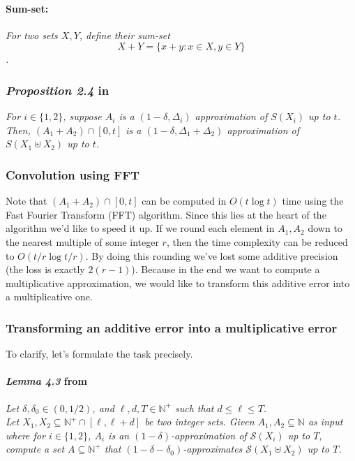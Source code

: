 \paragraph{Sum-set:}
\textit{For two sets \( X, Y \), define their sum-set \[ X + Y = \{x + y : x \in X, y \in Y\} \].}


\subsubsection{\textit{Proposition 2.4} in \cite{deng}} 

\textit{For \(i \in \{1, 2\}\), suppose \(A_i\) is a \((1 - \delta, \Delta_i)\) approximation of \(S(X_i)\) up to \(t\). Then, \((A_1 + A_2) \cap [0, t]\) is a \((1 - \delta, \Delta_1 + \Delta_2)\) approximation of \(S(X_1 \uplus X_2)\) up to \(t\).} \\

\subsubsection{Convolution using FFT}

Note that \((A_1 + A_2) \cap [0, t]\) can be computed in \(O(t \log t)\) time using the Fast Fourier Transform (FFT) algorithm. Since this lies at the heart of the algorithm we'd like to speed it up. If we round each element in \(A_1, A_2\) down to the nearest multiple of some integer $r$, then the time complexity can be reduced to \(O(t / r \log t / r)\). 
By doing this rounding we've lost some additive precision (the loss is exactly $2(r-1)$).  Because in the end we want to compute a multiplicative approximation, we would like to transform this additive error into a multiplicative one. 

\subsubsection{Transforming an additive error into a multiplicative error}
To clarify, let's formulate the task precisely.
\paragraph{\textit{Lemma 4.3} from \cite{deng}} \textit{Let \(\delta, \delta_0 \in (0, 1/2)\), and \(\ell, d, T \in \mathbb{N}^+\) such that \(d \leq \ell \leq T\).}\\
\textit{Let \(X_1, X_2 \subseteq \mathbb{N}^+ \cap [\ell, \ell + d]\) be two integer sets. Given \(A_1, A_2 \subseteq \mathbb{N}\) as input where for \(i \in \{1, 2\}\), \(A_i\) is an \((1 - \delta)\)-approximation of \(\mathcal{S}(X_i)\) up to \(T\), compute a set \(A \subseteq \mathbb{N}^+\) that \((1 - \delta - \delta_0)\)-approximates \(\mathcal{S}(X_1 \uplus X_2)\) up to \(T\).} \\

